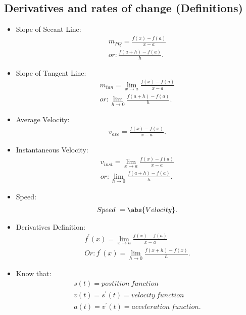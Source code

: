 \documentclass{report}
\begin{document}
    \subsection{Derivatives and rates of change (Definitions)}
    \begin{itemize}
      \item Slope of Secant Line:
        \begin{align*}
          m_{PQ} = \frac{f(x)- f(a)}{x-a} \\
          or: 
          \frac{f(a+h)- f(a)}{h}
        .\end{align*}
      \item Slope of Tangent Line:
        \begin{align*}
          m_{tan} = \lim\limits_{x \to a}{\frac{f(x)- f(a)}{x-a}} \\
          or: 
          \lim\limits_{h \to 0}{\frac{f(a+h)- f(a)}{h}}
        .\end{align*}
      \item Average Velocity:
        \begin{align*}
          v_{ave} = \frac{f(x)- f(x)}{x-a}
        .\end{align*}
      \item Instantaneous Velocity:
        \begin{align*}
          v_{inst} = \lim\limits_{x \to a}{\frac{f(x)- f(a)}{x-a}} \\
          or: 
          \lim\limits_{h \to 0}{\frac{f(a+h)- f(a)}{h}}
        .\end{align*}
      \item Speed:
        \begin{align*}
          Speed\ = \abs{Velocity}
        .\end{align*}
      \item Derivatives Definition:
        \begin{align*}
          f^{\prime}(x) = \lim\limits_{x \to a}{\frac{f(x)-f(a)}{x-a}} \\
          Or:
          f^{\prime}(x) = \lim\limits_{h \to 0}{\frac{f(x+h)-f(x)}{h}}
        .\end{align*}
      \item Know that:
    \begin{align*}
      s(t) = postition\ function \\
      v(t) = s^{\prime}(t) = velocity\ function \\
      a(t) = v^{\prime}(t) = acceleration\ function
    .\end{align*}
    \end{itemize}
    \bigbreak \noindent \bigbreak \noindent 
\end{document}
